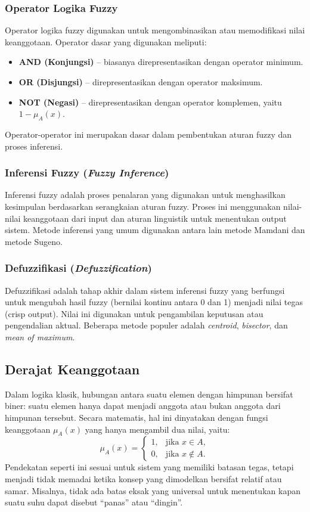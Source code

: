 \documentclass[12pt,a4paper]{article}
\theoremstyle{remark}
\begin{document}
\subsubsection{Operator Logika Fuzzy}
Operator logika fuzzy digunakan untuk mengombinasikan atau memodifikasi nilai keanggotaan. Operator dasar yang digunakan meliputi:
\begin{itemize}
    \item \textbf{AND (Konjungsi)} – biasanya direpresentasikan dengan operator minimum.
    \item \textbf{OR (Disjungsi)} – direpresentasikan dengan operator maksimum.
    \item \textbf{NOT (Negasi)} – direpresentasikan dengan operator komplemen, yaitu \(1 - \mu_A(x)\).
\end{itemize}
Operator-operator ini merupakan dasar dalam pembentukan aturan fuzzy dan proses inferensi.

\subsubsection{Inferensi Fuzzy (\textit{Fuzzy Inference})}
Inferensi fuzzy adalah proses penalaran yang digunakan untuk menghasilkan kesimpulan berdasarkan serangkaian aturan fuzzy. Proses ini menggunakan nilai-nilai keanggotaan dari input dan aturan linguistik untuk menentukan output sistem.
Metode inferensi yang umum digunakan antara lain metode Mamdani dan metode Sugeno.

\subsubsection{Defuzzifikasi (\textit{Defuzzification})}
Defuzzifikasi adalah tahap akhir dalam sistem inferensi fuzzy yang berfungsi untuk mengubah hasil fuzzy (bernilai kontinu antara 0 dan 1) menjadi nilai tegas (crisp output). Nilai ini digunakan untuk pengambilan keputusan atau pengendalian aktual. Beberapa metode populer adalah \textit{centroid}, \textit{bisector}, dan \textit{mean of maximum}.

\subsection{Derajat Keanggotaan}

Dalam logika klasik, hubungan antara suatu elemen dengan himpunan bersifat biner: suatu elemen hanya dapat menjadi anggota atau bukan anggota dari himpunan tersebut. Secara matematis, hal ini dinyatakan dengan fungsi keanggotaan \(\mu_A(x)\) yang hanya mengambil dua nilai, yaitu:
\[
    \mu_A(x) =
    \begin{cases}
        1, & \text{jika } x \in A,    \\
        0, & \text{jika } x \notin A.
    \end{cases}
\]
Pendekatan seperti ini sesuai untuk sistem yang memiliki batasan tegas, tetapi menjadi tidak memadai ketika konsep yang dimodelkan bersifat relatif atau samar. Misalnya, tidak ada batas eksak yang universal untuk menentukan kapan suatu suhu dapat disebut “panas” atau “dingin”.
\end{document}
